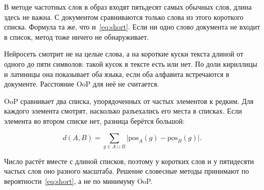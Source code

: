В методе частотных слов в образ входят пятьдесят самых обычных слов, длина здесь не важна. С документом сравниваются только слова из этого короткого списка. Формула та же, что и~\eqref{eq:short}. Если ни одно слово документа не входит в список, метод тоже ничего не обнаруживает.

Нейросеть смотрит не на целые слова, а на короткие куски текста длиной от одного до пяти символов: такой кусок в тексте есть или нет. По доли кириллицы и латиницы она показывает оба языка, если оба алфавита встречаются в документе. Расстояние OoP для неё не считается.

OoP сравнивает два списка, упорядоченных от частых элементов к редким. Для каждого элемента смотрят, насколько разъехались его места в списках. Если элемента во втором списке нет, разница берётся большой:

\begin{equation}
	d(A,B) = \sum_{g \in A \cup B} \lvert \mathrm{pos}_A(g) - \mathrm{pos}_B(g) \rvert.
	\label{eq:oop}
\end{equation}

Число растёт вместе с длиной списков, поэтому у коротких слов и у пятидесяти частых слов оно разного масштаба. Решение словесные методы принимают по вероятности~\eqref{eq:short}, а не по минимуму OoP.
